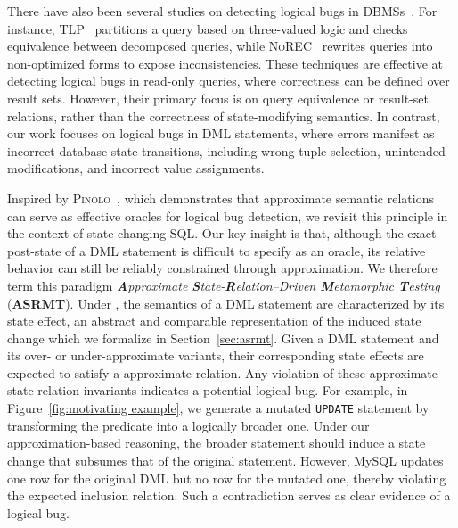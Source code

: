 There have also been several studies on detecting logical bugs in DBMSs~\cite{rigger2020detecting,rigger2020finding,rigger2020testing,tang2023detecting,jiang2024detecting,song2024detecting,hao2023pinolo,deng2025detecting}.
For instance, \textsc{TLP}~\cite{rigger2020finding} partitions a query based on three-valued logic and checks equivalence between decomposed queries, while \textsc{NoREC}~\cite{rigger2020detecting} rewrites queries into non-optimized forms to expose inconsistencies.
These techniques are effective at detecting logical bugs in read-only queries, where correctness can be defined over result sets.
However, their primary focus is on query equivalence or result-set relations, rather than the correctness of state-modifying semantics.
In contrast, our work focuses on logical bugs in DML statements, where errors manifest as incorrect database state transitions, including wrong tuple selection, unintended modifications, and incorrect value assignments.

Inspired by \textsc{Pinolo}~\cite{hao2023pinolo}, which demonstrates that approximate semantic relations can serve as effective oracles for logical bug detection, we revisit this principle in the context of state-changing SQL. 
Our key insight is that, although the exact post-state of a DML statement is difficult to specify as an oracle, its relative behavior can still be reliably constrained through approximation. 
We therefore term this paradigm \textit{\textbf{A}pproximate \textbf{S}tate-\textbf{R}elation–Driven \textbf{M}etamorphic \textbf{T}esting} (\textbf{ASRMT}). 
Under \model, the semantics of a DML statement are characterized by its state effect, an abstract and comparable representation of the induced state change which we formalize in Section~\ref{sec:asrmt}. 
Given a DML statement and its over- or under-approximate variants, their corresponding state effects are expected to satisfy a approximate relation. 
Any violation of these approximate state-relation invariants indicates a potential logical bug.
For example, in Figure~\ref{fig:motivating example}, we generate a mutated \texttt{UPDATE} statement by transforming the predicate into a logically broader one. 
Under our approximation-based reasoning, the broader statement should induce a state change that subsumes that of the original statement. 
However, MySQL updates one row for the original DML but no row for the mutated one, thereby violating the expected inclusion relation. 
Such a contradiction serves as clear evidence of a logical bug.

